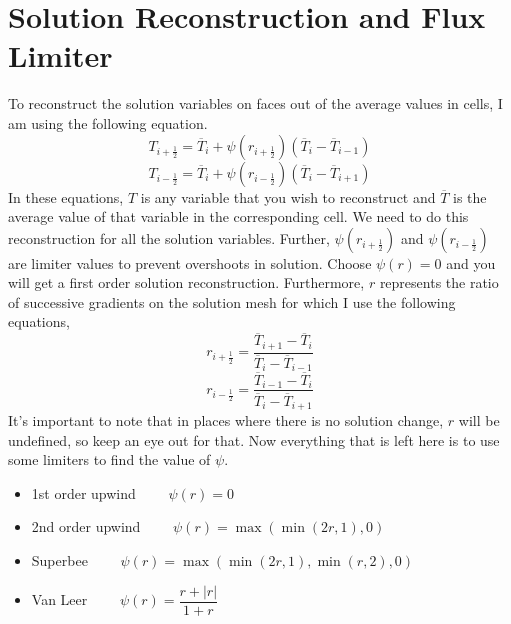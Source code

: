 \documentclass{article}
\begin{document}
\section{Solution Reconstruction and Flux Limiter}
To reconstruct the solution variables on faces out of the average values in cells, I am using the following equation.
\begin{equation*}
T_{i+\frac{1}{2}}=\overline{T}_i+\psi(r_{i+\frac{1}{2}}) (\overline{T}_i-\overline{T}_{i-1})
\end{equation*}
\begin{equation*}
T_{i-\frac{1}{2}}=\overline{T}_i+\psi(r_{i-\frac{1}{2}}) (\overline{T}_i-\overline{T}_{i+1})
\end{equation*}
In these equations, $T$ is any variable that you wish to reconstruct and $\overline{T}$ is the average value of that variable in the corresponding cell. We need to do this reconstruction for all the solution variables. Further, $\psi(r_{i+\frac{1}{2}})$ and $\psi(r_{i-\frac{1}{2}})$ are limiter values to prevent overshoots in solution. Choose $\psi(r)=0$ and you will get a first order solution reconstruction. Furthermore, $r$ represents the ratio of successive gradients on the solution mesh for which I use the following equations,
\begin{equation*}
r_{i+\frac{1}{2}}=\dfrac{\overline{T}_{i+1}-\overline{T}_{i}}{\overline{T}_{i}-\overline{T}_{i-1}}
\end{equation*}
\begin{equation*}
r_{i-\frac{1}{2}}=\dfrac{\overline{T}_{i-1}-\overline{T}_{i}}{\overline{T}_{i}-\overline{T}_{i+1}}
\end{equation*}
It's important to note that in places where there is no solution change, $r$ will be undefined, so keep an eye out for that. Now everything that is left here is to use some limiters to find the value of $\psi$.
\begin{itemize}
\item 1st order upwind $\qquad \psi(r)=0$
\item 2nd order upwind $\qquad \psi(r)=\max(\min(2r,1),0)$
\item Superbee $\qquad \psi(r)=\max(\min(2r,1),\min(r,2),0)$
\item Van Leer $\qquad \psi(r)=\dfrac{r+|r|}{1+r}$
\end{itemize}
\end{document}
